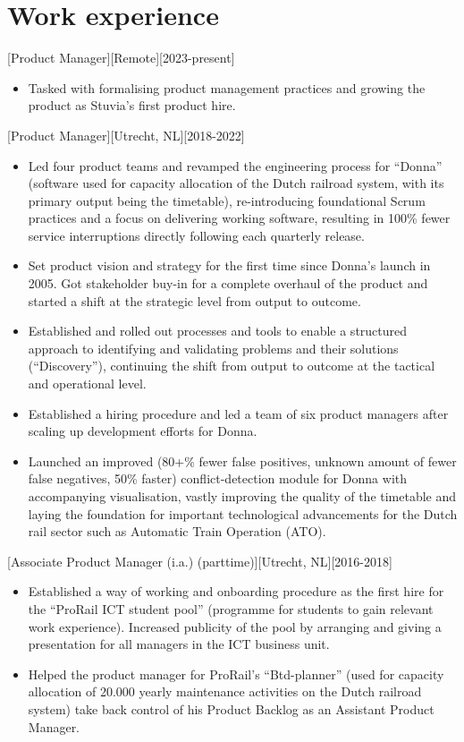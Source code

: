 \documentclass[10pt]{article}
\begin{document}
\makecvtitle

\section{Work experience}
\label{sec:work}

[Product Manager][Remote][2023-present]
\begin{itemize}
    \item Tasked with formalising product management practices and growing the product as Stuvia's first product hire.
\end{itemize}

[Product Manager][Utrecht, NL][2018-2022]
\begin{itemize}
    \item Led four product teams and revamped the engineering process for \enquote{Donna} (software used for capacity allocation of the Dutch railroad system, with its primary output being the timetable), re-introducing foundational Scrum practices and a focus on delivering working software, resulting in 100\% fewer service interruptions directly following each quarterly release.
    \item Set product vision and strategy for the first time since Donna's launch in 2005. Got stakeholder buy-in for a complete overhaul of the product and started a shift at the strategic level from output to outcome.
    \item Established and rolled out processes and tools to enable a structured approach to identifying and validating problems and their solutions (\enquote{Discovery}), continuing the shift from output to outcome at the tactical and operational level.
    \item Established a hiring procedure and led a team of six product managers after scaling up development efforts for Donna.
    \item Launched an improved (80+\% fewer false positives, unknown amount of fewer false negatives, 50\% faster) conflict-detection module for Donna with accompanying visualisation, vastly improving the quality of the timetable and laying the foundation for important technological advancements for the Dutch rail sector such as Automatic Train Operation (ATO).
\end{itemize}

[Associate Product Manager (i.a.) (parttime)][Utrecht, NL][2016-2018]
\begin{itemize}
    \item Established a way of working and onboarding procedure as the first hire for the \enquote{ProRail ICT student pool} (programme for students to gain relevant work experience). Increased publicity of the pool by arranging and giving a presentation for all managers in the ICT business unit.
    \item Helped the product manager for ProRail's \enquote{Btd-planner} (used for capacity allocation of 20.000 yearly maintenance activities on the Dutch railroad system) take back control of his Product Backlog as an Assistant Product Manager.
\end{itemize}
\end{document}
